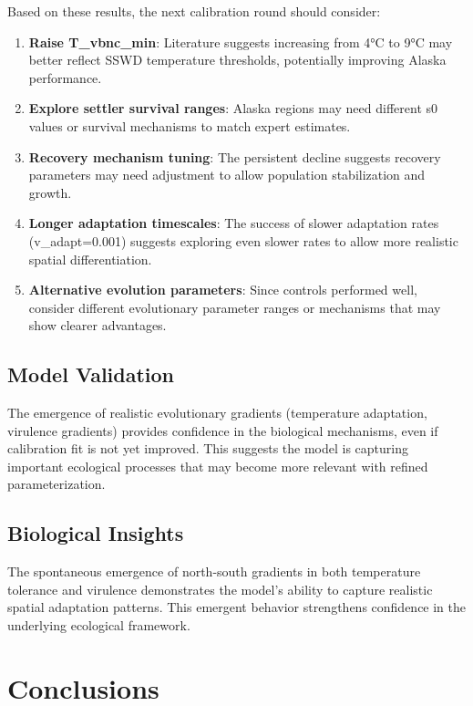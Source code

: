 \documentclass[11pt,a4paper]{article}
\begin{document}
Based on these results, the next calibration round should consider:

\begin{enumerate}
\item \textbf{Raise T\_vbnc\_min}: Literature suggests increasing from 4°C to 9°C may better reflect SSWD temperature thresholds, potentially improving Alaska performance.

\item \textbf{Explore settler survival ranges}: Alaska regions may need different s0 values or survival mechanisms to match expert estimates.

\item \textbf{Recovery mechanism tuning}: The persistent decline suggests recovery parameters may need adjustment to allow population stabilization and growth.

\item \textbf{Longer adaptation timescales}: The success of slower adaptation rates (v\_adapt=0.001) suggests exploring even slower rates to allow more realistic spatial differentiation.

\item \textbf{Alternative evolution parameters}: Since controls performed well, consider different evolutionary parameter ranges or mechanisms that may show clearer advantages.
\end{enumerate}

\subsection{Model Validation}

The emergence of realistic evolutionary gradients (temperature adaptation, virulence gradients) provides confidence in the biological mechanisms, even if calibration fit is not yet improved. This suggests the model is capturing important ecological processes that may become more relevant with refined parameterization.

\subsection{Biological Insights}

The spontaneous emergence of north-south gradients in both temperature tolerance and virulence demonstrates the model's ability to capture realistic spatial adaptation patterns. This emergent behavior strengthens confidence in the underlying ecological framework.

\section{Conclusions}
\end{document}
